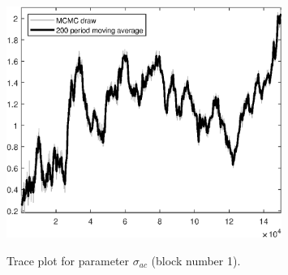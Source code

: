 \begin{figure}[H]
\centering
  \includegraphics[width=0.8\textwidth]{BRS_sectoral_KK/graphs/TracePlot_sigma_ac_blck_1}\\
    \caption{Trace plot for parameter ${\sigma_{ac}}$ (block number 1).}
\end{figure}
